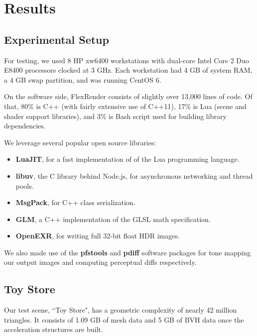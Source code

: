 \documentclass[12pt]{ucthesis}
\begin{document}
\chapter{Results}
\label{results}

\section{Experimental Setup}
\label{setup}

For testing, we used 8 HP xw6400 workstations with dual-core Intel Core 2 Duo E8400
processors clocked at 3 GHz. Each workstation had 4 GB of system RAM, a 4 GB
swap partition, and was running CentOS 6.

On the software side, FlexRender consists of slightly over 13,000 lines of code. Of
that, 80\% is C++ (with fairly extensive use of C++11), 17\% is Lua (scene and
shader support libraries), and 3\% is Bash script used for building library dependencies.

We leverage several popular open source libraries:

\begin{itemize}
    \item \textbf{LuaJIT}, for a fast implementation of of the Lua programming language.
    \item \textbf{libuv}, the C library behind Node.js, for asynchronous networking and thread pools.
    \item \textbf{MsgPack}, for C++ class serialization.
    \item \textbf{GLM}, a C++ implementation of the GLSL math specification.
    \item \textbf{OpenEXR}, for writing full 32-bit float HDR images.
\end{itemize}

We also made use of the \textbf{pfstools} and \textbf{pdiff} software packages
for tone mapping our output images and computing perceptual diffs respectively.

\section{Toy Store}
\label{toystore}

Our test scene, ``Toy Store", has a geometric complexity of nearly 42 million
triangles. It consists of 1.09 GB of mesh data and 5 GB of BVH data once the
acceleration structures are built.
\end{document}
